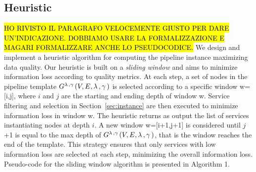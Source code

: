 \subsection{Heuristic}\label{subsec:heuristics}
\hl{HO RIVISTO IL PARAGRAFO VELOCEMENTE GIUSTO PER DARE UN'INDICAZIONE. DOBBIAMO USARE LA FORMALIZZAZIONE E MAGARI FORMALIZZARE ANCHE LO PSEUDOCODICE.} We design and implement a heuristic algorithm for computing the pipeline instance maximizing data quality. Our heuristic is built on a \emph{sliding window} and aims to minimize information loss according to quality metrics. At each step, a set of nodes in the pipeline template $G^{\lambda\,,\gamma\,}(V,E,\lambda\,,\gamma\,)$ is selected according to a specific window w=[i,j], where $i$ and $j$ are the starting and ending depth of window w. Service filtering and selection in Section~\ref{sec:instance} are then executed to minimize information loss in window w. The heuristic returns as output the list of services instantiating nodes at depth $i$. A new window w=[i+1,j+1] is considered until $j$+1 is equal to the max depth of $G^{\lambda\,,\gamma\,}(V,E,\lambda\,,\gamma\,)$, that is the window reaches the end of the template. 
This strategy ensures that only services with low information loss are selected at each step, minimizing the overall information loss. Pseudo-code for the sliding window algorithm is presented in Algorithm 1.

